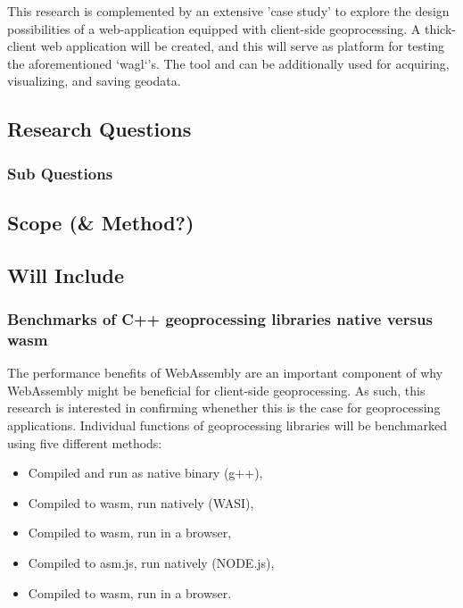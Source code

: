 This research is complemented by an extensive 'case study' to explore the design possibilities of a web-application equipped with client-side geoprocessing. 
A thick-client web application will be created, and this will serve as platform for testing the aforementioned `wagl`'s. 
The tool and can be additionally used for acquiring, visualizing, and saving geodata. 


\subsection{Research Questions}



\subsubsection*{Sub Questions}



\newpage
\subsection{Scope (\& Method?)}


\subsection*{Will Include}

\subsubsection*{Benchmarks of C++ geoprocessing libraries native versus wasm}

The performance benefits of WebAssembly are an important component of why WebAssembly might be beneficial for client-side geoprocessing. As such, this research is interested in confirming whenether this is the case for geoprocessing applications. Individual functions of geoprocessing libraries will be benchmarked using five different methods: 

\begin{itemize}
    \item Compiled and run as native binary (g++), 
    \item Compiled to wasm, run natively (WASI),
    \item Compiled to wasm, run in a browser,
    \item Compiled to asm.js, run natively (NODE.js),
    \item Compiled to wasm, run in a browser. 
\end{itemize}


